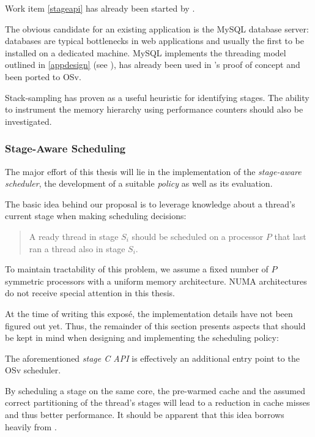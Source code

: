 \documentclass{article}
\begin{document}
Work item \ref{stageapi} has already been started by \citeauthor{gottschlag2017}.

The obvious candidate for an existing application is the MySQL database server:
databases are typical bottlenecks in web applications and usually the first to be installed on a dedicated machine.
MySQL implements the threading model outlined in \ref{appdesign} (see \cite{mysqlThreading}),
has already been used in \citeauthor{gottschlag2017}'s proof of concept
and been ported to OSv. \label{willusemysqlfirst}

Stack-sampling has proven as a useful heuristic for identifying stages.
The ability to instrument the memory hierarchy using performance counters should also be investigated.

\subsubsection{Stage-Aware Scheduling}\label{stageawaresched}

The major effort of this thesis will lie in the implementation of the \emph{stage-aware scheduler}, the development of a suitable \emph{policy} as well as its evaluation.

The basic idea behind our proposal is to leverage knowledge about a thread's current stage when making scheduling decisions:
\begin{quote} %
A ready thread in stage $S_i$ should be scheduled on a processor $P$ that last ran a thread also in stage $S_i$.
\end{quote}

To maintain tractability of this problem, we assume a fixed number of $P$ symmetric processors with a uniform memory architecture.
NUMA architectures do not receive special attention in this thesis. %

At the time of writing this exposé, the implementation details have not been figured out yet.
Thus, the remainder of this section presents aspects that should be kept in mind when designing and implementing the scheduling policy:

The aforementioned \textit{stage C API} is effectively an additional entry point to the OSv scheduler.

By scheduling a stage on the same core, the pre-warmed cache and
the assumed correct partitioning of the thread's stages
will lead to a reduction in cache misses and thus better performance.
It should be apparent that this idea borrows heavily from \cite{sodaspr,cohort}.
\end{document}
